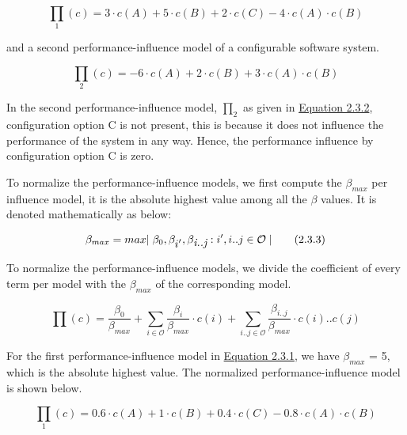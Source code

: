 \begin{equation*}
  \prod_1{(c)} = 3 \cdot c(A) + 5  \cdot c(B) + 2 \cdot c(C) - 4 \cdot  c(A) \cdot c(B)
   \tag{2.3.1}\label{eq:2.3.1}
\end{equation*}

and a second performance-influence model of a configurable software system.

\begin{equation*}
  \prod_2{(c)} = -6 \cdot c(A) + 2  \cdot c(B) + 3 \cdot  c(A) \cdot c(B)
   \tag{2.3.2}\label{eq:2.3.2}
\end{equation*}

In the second performance-influence model, $\prod_2$ as given in \hyperref[eq:2.3.2]{Equation 2.3.2}, configuration option C is not present, this is because it does not influence the performance of the system in any way. Hence, the performance influence by configuration option C is zero.

To normalize the performance-influence models, we first compute the $\beta_{max}$ per influence model, it is the absolute highest value among all the $\beta$ values. It is denoted mathematically as below:

\begin{equation*}
     \beta_{max} = max { \mid \beta_{0} , \beta_{\mathlarger{i^{\prime}}} ,  \beta_{\mathlarger{\textit{i..j}}} :  {i^{\prime}, i..j \in \mathcal{O}}  \mid }
  \tag{2.3.3}\label{eq:2.3.3} 
\end{equation*}

To normalize the performance-influence models, we divide the coefficient of every term per model with the $\beta_{max}$ of the corresponding model.

\begin{equation*}
  \prod {(c)} = \frac{\beta_{\mathrm{0}}}{\beta_{max}}  + \sum_{i \in \mathcal{O}} \frac{\beta_{\textit{i}}}{\beta_{max}} \cdot {c(i)} + 
 \sum_{i..j \in \mathcal{O}} 
 \frac{\beta_{\textit{i..j}}}{\beta_{max}} \cdot c(i)..c(j)
  \tag{2.3.4}\label{eq:2.3.4} 
\end{equation*}

For the first performance-influence model in \hyperref[eq:2.3.1]{Equation 2.3.1}, we have $\beta_{max}$ = 5, which is the absolute highest value. The normalized performance-influence model is shown below.

\begin{equation*}
  \prod_1{(c)} = 0.6 \cdot c(A) + 1  \cdot c(B) + 0.4 \cdot c(C) - 0.8 \cdot  c(A) \cdot c(B)
   \tag{2.3.5}\label{eq:2.3.5}
\end{equation*}

